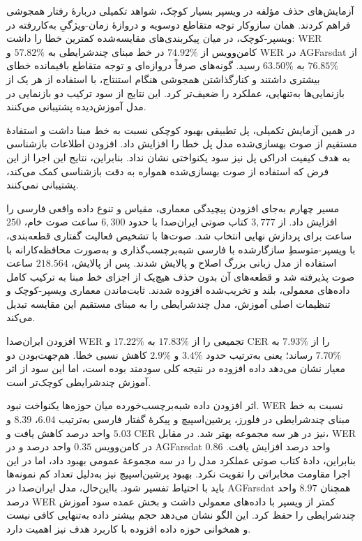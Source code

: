 آزمایش‌های حذف مؤلفه در ویسپر بسیار کوچک، شواهد تکمیلی دربارهٔ رفتار همجوشی فراهم کردند. همان سازوکار توجه متقاطع دوسویه و دروازهٔ زمان-ویژگیِ به‌کاررفته در ویسپر-کوچک، در میان پیکربندی‌های مقایسه‌شده کمترین خطا را داشت: WER کامن‌وویس از $74.92\%$ در خط مبنای چندشرایطی به $57.82\%$ و WER در AGFarsdat از $76.85\%$ به $63.50\%$ رسید. گونه‌های صرفاً دروازه‌ای و توجه متقاطع باقیمانده خطای بیشتری داشتند و کنارگذاشتن همجوشی هنگام استنتاج، با استفاده از هر یک از بازنمایی‌ها به‌تنهایی، عملکرد را ضعیف‌تر کرد. این نتایج از سود ترکیب دو بازنمایی در مدل آموزش‌دیده پشتیبانی می‌کنند.

در همین آزمایش تکمیلی، پل تطبیقی بهبود کوچکی نسبت به خط مبنا داشت و استفادهٔ مستقیم از صوت بهسازی‌شده مدل پل خطا را افزایش داد. افزودن اطلاعات بازشناسی به هدف کیفیت ادراکی پل نیز سود یکنواختی نشان نداد. بنابراین، نتایج این اجرا از این فرض که استفاده از صوت بهسازی‌شده همواره به دقت بازشناسی کمک می‌کند، پشتیبانی نمی‌کنند.


مسیر چهارم به‌جای افزودن پیچیدگی معماری، مقیاس و تنوع داده واقعی فارسی را افزایش داد. از $3{,}777$ کتاب صوتی ایران‌صدا با حدود $6{,}300$ ساعت صوت خام، $250$ ساعت برای پردازش نهایی انتخاب شد. صوت‌ها با تشخیص فعالیت گفتاری قطعه‌بندی، با ویسپر-متوسطِ سازگارشده با فارسی شبه‌برچسب‌گذاری و به‌صورت محافظه‌کارانه با استفاده از مدل زبانی بزرگ اصلاح و پالایش شدند. پس از پالایش، $218.564$ ساعت صوت پذیرفته شد و قطعه‌های آن بدون حذف هیچ‌یک از اجزای خط مبنا به ترکیب کامل داده‌های معمولی، بلند و تخریب‌شده افزوده شدند. ثابت‌ماندن معماری ویسپر-کوچک و تنظیمات اصلی آموزش، مدل چندشرایطی را به مبنای مستقیم این مقایسه تبدیل می‌کند.

افزودن ایران‌صدا WER تجمیعی را از $17.83\%$ به $17.22\%$ و CER را از $7.93\%$ به $7.70\%$ رساند؛ یعنی به‌ترتیب حدود $3.4\%$ و $2.9\%$ کاهش نسبی خطا. هم‌جهت‌بودن دو معیار نشان می‌دهد داده افزوده در نتیجه کلی سودمند بوده است، اما این سود از اثر آموزش چندشرایطی کوچک‌تر است.

اثر افزودن داده شبه‌برچسب‌خورده میان حوزه‌ها یکنواخت نبود. WER نسبت به خط مبنای چندشرایطی در فلورز، پرشین‌اسپیچ و پیکرهٔ گفتار فارسی به‌ترتیب $6.04$، $8.39$ و $5.03$ واحد درصد کاهش یافت و CER نیز در هر سه مجموعه بهتر شد. در مقابل، WER در کامن‌وویس $0.35$ واحد درصد و در AGFarsdat $0.86$ واحد درصد افزایش یافت. بنابراین، دادهٔ کتاب صوتی عملکرد مدل را در سه مجموعهٔ عمومی بهبود داد، اما در این اجرا مقاومت مخابراتی را تقویت نکرد. بهبود پرشین‌اسپیچ نیز به‌دلیل تعداد کم نمونه‌ها باید با احتیاط تفسیر شود. بااین‌حال، مدل ایران‌صدا در AGFarsdat همچنان $8.97$ واحد درصد WER کمتر از ویسپر با داده‌های معمولی داشت و بخش عمده سود آموزش چندشرایطی را حفظ کرد. این الگو نشان می‌دهد حجم بیشتر داده به‌تنهایی کافی نیست و همخوانی حوزه داده افزوده با کاربرد هدف نیز اهمیت دارد.

